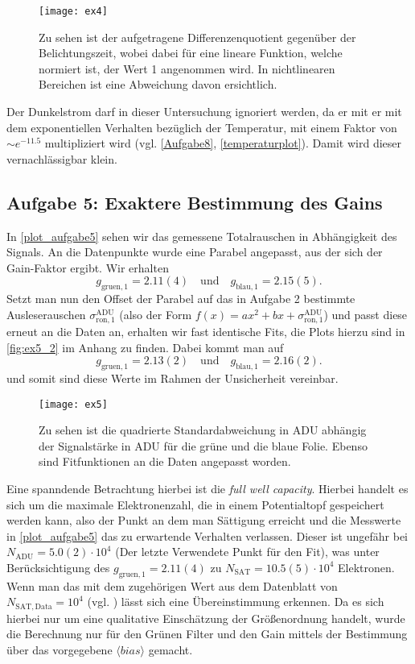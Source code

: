 \begin{figure}[H]
	\centering
	\texttt{[image: ex4]}
	\caption{Zu sehen ist der aufgetragene Differenzenquotient gegenüber der Belichtungszeit, wobei dabei für eine lineare Funktion, welche normiert ist, der Wert 1 angenommen wird. In nichtlinearen Bereichen ist eine Abweichung davon ersichtlich. }
	\label{fig:ex4}
\end{figure}
Der Dunkelstrom darf in dieser Untersuchung ignoriert werden, da er mit er mit dem exponentiellen Verhalten bezüglich der Temperatur, mit einem Faktor von  $\sim e^{-11.5} $ multipliziert wird (vgl. \autoref{Aufgabe8}, \autoref{temperaturplot}). Damit wird dieser vernachlässigbar klein.




\subsection{Aufgabe 5: Exaktere Bestimmung des Gains }
\label{subsec:ex5}

In \autoref{plot_aufgabe5} sehen wir das gemessene Totalrauschen in Abhängigkeit des Signals. An die Datenpunkte wurde eine Parabel angepasst, aus der sich der Gain-Faktor ergibt. Wir erhalten
$$g_\mathrm{gruen, 1} = 2.11(4) \quad \mathrm{und}\quad g_\mathrm{blau, 1} = 2.15(5).  $$
Setzt man nun den Offset der Parabel auf das in Aufgabe 2 bestimmte Ausleserauschen $\sigma_{\mathrm{ron, 1}}^{\mathrm{ADU}}$ (also der Form $f(x) = ax^2+bx + \sigma_{\mathrm{ron, 1}}^{\mathrm{ADU}}$) und passt diese erneut an die Daten an, erhalten wir fast identische Fits, die Plots hierzu sind in \autoref{fig:ex5_2} im Anhang zu finden. Dabei kommt man auf 
$$g_\mathrm{gruen, 1} = 2.13(2) \quad \mathrm{und}\quad g_\mathrm{blau, 1} = 2.16(2).  $$ und somit sind diese Werte im Rahmen der Unsicherheit vereinbar.


\begin{figure}[H]
	\centering
	\texttt{[image: ex5]}
	\caption{Zu sehen ist die quadrierte Standardabweichung in ADU abhängig der Signalstärke in ADU für die grüne und die blaue Folie. Ebenso sind Fitfunktionen an die Daten angepasst worden. }
	\label{plot_aufgabe5}
\end{figure}

Eine spanndende Betrachtung hierbei ist die \textit{full well capacity}. Hierbei handelt es sich um die maximale Elektronenzahl, die in einem Potentialtopf gespeichert werden kann,  also der Punkt an dem man Sättigung erreicht und die Messwerte in \autoref{plot_aufgabe5} das zu erwartende Verhalten verlassen. Dieser ist ungefähr bei $N_\mathrm{ADU}=5.0(2) \cdot 10^4$ (Der letzte Verwendete Punkt für den Fit), was  unter Berücksichtigung des $g_\mathrm{gruen, 1} = 2.11(4) $ zu $N_\mathrm{SAT}=10.5(5) \cdot 10^4$ Elektronen. Wenn man das mit dem zugehörigen Wert aus dem Datenblatt von $N_\mathrm{SAT,Data}=10^4$ (vgl. \autocite{DATENBLATTCCD}) lässt sich eine Übereinstimmung erkennen. Da es sich hierbei nur um eine qualitative Einschätzung der Größenordnung handelt, wurde die Berechnung nur für den Grünen Filter und den Gain mittels der Bestimmung über das vorgegebene $\langle bias\rangle$ gemacht. 

